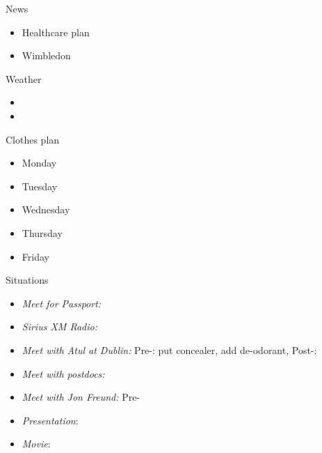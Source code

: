 \documentclass[serif, mathserif, final]{beamer}
\begin{document}
\begin{frame}{}
\begin{columns}
    \begin{column}{0.20\linewidth}
      \begin{block}{News}
        \begin{itemize}   
          \tiny \item \tiny Healthcare plan 
        \item \tiny Wimbledon 
        \end{itemize}
      \end{block}
      \begin{block}{Weather} 
        \begin{itemize}
          \tiny \item \tiny 
        \item \tiny 
        \end{itemize}
      \end{block} 
      \begin{block}{Clothes plan} 
        \begin{itemize} 
          \tiny \item \tiny Monday
        \item \tiny Tuesday
        \item \tiny Wednesday
        \item \tiny Thursday
        \item \tiny Friday
        \end{itemize} 
      \end{block}

      \begin{block}{Situations}
        \begin{itemize} 
          \item \tiny \textit{Meet for Passport:} 
          \item \tiny \textit{Sirius XM Radio:} 

          \item \tiny \textit{Meet with Atul at Dublin:} Pre-: put concealer, add de-odorant, Post-:
            
          \item \tiny \textit{Meet with postdocs:}
          \item \tiny \textit{Meet with Jon Freund:} Pre- 
          \item \tiny \textit{Presentation}:             
          \item \tiny \textit{Movie}: 


\end{itemize}
\end{block}
\end{column}
\end{columns}
\end{frame}
\end{document}
